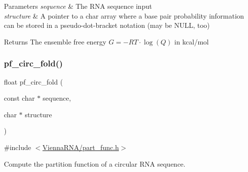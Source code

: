 \begin{DoxyParams}{Parameters}
{\em sequence} & The R\+NA sequence input \\
\hline
{\em structure} & A pointer to a char array where a base pair probability information can be stored in a pseudo-\/dot-\/bracket notation (may be N\+U\+LL, too) \\
\hline
\end{DoxyParams}
\begin{DoxyReturn}{Returns}
The ensemble free energy $G = -RT \cdot \log(Q) $ in kcal/mol 
\end{DoxyReturn}
\mbox{\label{group__part__func__global__deprecated_ga819ce5fca8984004ac81c4a3b04cb735}} 
\subsubsection{\texorpdfstring{pf\_circ\_fold()}{pf\_circ\_fold()}}
{\footnotesize\ttfamily float pf\+\_\+circ\+\_\+fold (\begin{DoxyParamCaption}\item[{const char $\ast$}]{sequence,  }\item[{char $\ast$}]{structure }\end{DoxyParamCaption})}



{\ttfamily \#include $<$\mbox{\hyperlink{part__func_8h}{Vienna\+R\+N\+A/part\+\_\+func.\+h}}$>$}



Compute the partition function of a circular R\+NA sequence. 

